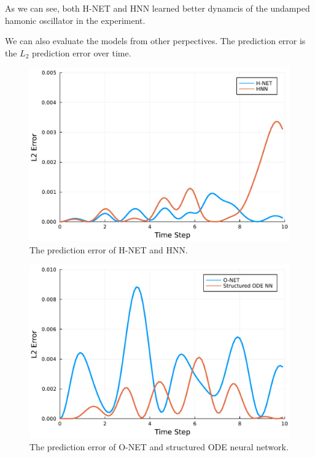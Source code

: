 \documentclass[
	parskip, 			   %
	twoside, 			   %
	DIV=14, 			   %
	BCOR=15.0mm, 		   %
	headsepline, 		   %
	open=right, 		   %
	captions=tableheading, %
	bibliography=totoc,    %
	numbers=noenddot       %
]{scrreprt}
\begin{document}
As we can see, both H-NET and HNN learned better dynamcis of the undamped hamonic oscillator in the experiment.

We can also evaluate the models from other perpectives. The prediction error is the $L_{2}$ prediction error over time.

\begin{figure}[h!]
    \centering
    \includegraphics[scale=0.5]{figures/prediction_error_H_NET_and_HNN.pdf}
    \caption{The prediction error of H-NET and HNN.}
    \label{fig:prediction_error_H_NET_and_HNN}
\end{figure}

\clearpage
\begin{figure}[h!]
    \centering
    \includegraphics[scale=0.5]{figures/prediction_error_O_NET_and_structured_ODE_NN.pdf}
    \caption{The prediction error of O-NET and structured ODE neural network.}
    \label{fig:prediction_error_O_NET_and_structured_ODE_NN}
\end{figure}
\end{document}
